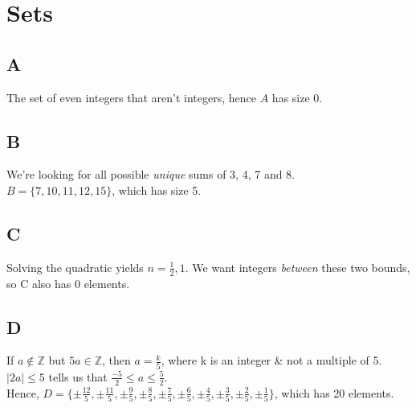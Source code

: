 \documentclass[a4paper, 12pt]{article}
\begin{document}
\section*{Sets}
\subsection*{A}
The set of even integers that aren't integers, hence $A$ has size 0.

\subsection*{B}
We're looking for all possible \emph{unique} sums of 3, 4, 7 and 8. \\

\noindent $B = \{7, 10, 11, 12, 15\}$, which has size 5.

\subsection*{C}
Solving the quadratic yields $n = \frac{1}{2}, 1$. We want integers \emph{between} these two bounds, so C also has 0 elements.

\subsection*{D}
If $a \not\in \mathbb{Z}$ but $5a \in \mathbb{Z}$, then $a = \frac{k}{5}$, where k is an integer \& not a multiple of 5. \\

\noindent $|2a| \leq 5$ tells us that $\frac{-5}{2} \leq a \leq \frac{5}{2}$. \\

\noindent Hence, $D = \{\pm \frac{12}{5}, \pm \frac{11}{5}, \pm \frac{9}{5}, \pm \frac{8}{5}, \pm \frac{7}{5}, \pm \frac{6}{5}, \pm \frac{4}{5}, \pm \frac{3}{5}, \pm \frac{2}{5}, \pm \frac{1}{5}\}$, which has 20 elements.
\end{document}
